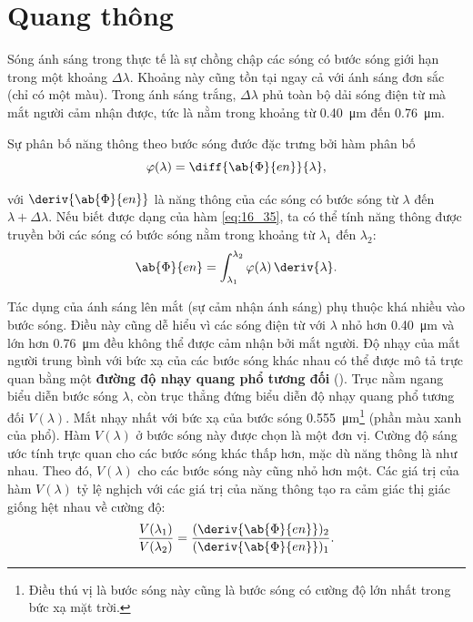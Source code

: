 \section{Quang thông}\label{sec:16_4}

Sóng ánh sáng trong thực tế là sự chồng chập các sóng có bước sóng giới hạn trong một khoảng $\Delta{\lambda}$.
Khoảng này cũng tồn tại ngay cả với ánh sáng đơn sắc (chỉ có một màu).
Trong ánh sáng trắng, $\Delta{\lambda}$ phủ toàn bộ dải sóng điện từ mà mắt người cảm nhận được, tức là nằm trong khoảng từ \SI{0.40}{\micro\metre} đến \SI{0.76}{\micro\metre}.

Sự phân bố năng thông theo bước sóng đước đặc trưng bởi hàm phân bố
\begin{equation}\label{eq:16_35}
    \varphi(\lambda) = \diff{\ab{\Phi}{en}}{\lambda},
\end{equation}

\noindent
với $\deriv{\ab{\Phi}{en}}$ là năng thông của các sóng có bước sóng từ $\lambda$ đến $\lambda+\Delta{\lambda}$.
Nếu biết được dạng của hàm \eqref{eq:16_35}, ta có thể tính năng thông được truyền bởi các sóng có bước sóng nằm trong khoảng từ $\lambda_1$ đến $\lambda_2$:
\begin{equation}\label{eq:16_36}
    \ab{\Phi}{en} = \int_{\lambda_1}^{\lambda_2} \varphi(\lambda)\, \deriv{\lambda}.
\end{equation}

\noindent
Tác dụng của ánh sáng lên mắt (sự cảm nhận ánh sáng) phụ thuộc khá nhiều vào bước sóng.
Điều này cũng dễ hiểu vì các sóng điện từ với $\lambda$ nhỏ hơn \SI{0.40}{\micro\metre} và lớn hơn \SI{0.76}{\micro\metre} đều không thể được cảm nhận bởi mắt người.
Độ nhạy của mắt người trung bình với bức xạ của các bước sóng khác nhau có thể được mô tả trực quan bằng một \textbf{đường độ nhạy quang phổ tương đối} ().
Trục nằm ngang biểu diễn bước sóng $\lambda$, còn trục thẳng đứng biểu diễn độ nhạy quang phổ tương đối $V(\lambda)$.
Mắt nhạy nhất với bức xạ của bước sóng \SI{0.555}{\micro\metre}\footnote{Điều thú vị là bước sóng này cũng là bước sóng có cường độ lớn nhất trong bức xạ mặt trời.} (phần màu xanh của phổ).
Hàm $V(\lambda)$ ở bước sóng này được chọn là một đơn vị.
Cường độ sáng ước tính trực quan cho các bước sóng khác thấp hơn, mặc dù năng thông là như nhau.
Theo đó, $V(\lambda)$ cho các bước sóng này cũng nhỏ hơn một.
Các giá trị của hàm $V(\lambda)$ tỷ lệ nghịch với các giá trị của năng thông tạo ra cảm giác thị giác giống hệt nhau về cường độ:
\begin{equation*}
    \frac{V(\lambda_1)}{V(\lambda_2)} = \frac{(\deriv{\ab{\Phi}{en}})_2}{(\deriv{\ab{\Phi}{en}})_1}.
\end{equation*}

